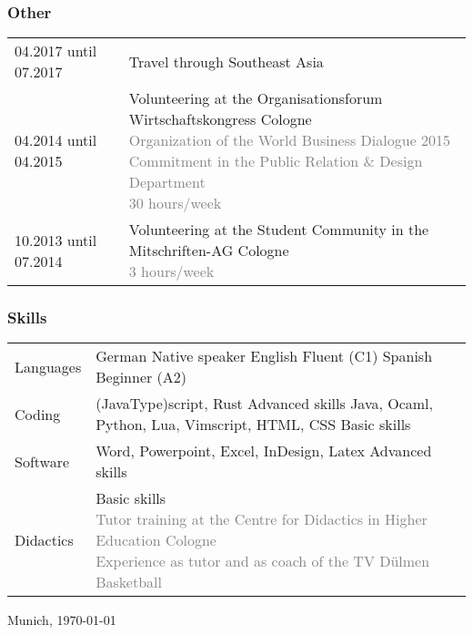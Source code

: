 \documentclass[USenglish]{article} %
\newcommand{\city}{Munich}
\begin{document}
\pagebreak
\subsubsection*{Other}
\begin{table}[h]
  \begin{tabularx}{\textwidth}{@{}p{4cm}X}

    04.2017 until 07.2017 &
    Travel through Southeast Asia \\

    04.2014 until 04.2015 &
    Volunteering at the Organisationsforum Wirtschaftskongress \textbar{} Cologne
    \textcolor{gray}{
      \newline Organization of the World Business Dialogue 2015
      \newline Commitment in the Public Relation \& Design Department
      \newline 30 hours/week} \\

    10.2013 until 07.2014 &
    Volunteering at the Student Community in the Mitschriften-AG \textbar{} Cologne
    \textcolor{gray}{
      \newline 3 hours/week} \\

  \end{tabularx}\label{tab:other}
\end{table}

\subsubsection*{Skills}
\begin{table}[h!]
  \begin{tabularx}{\textwidth}{@{}p{4cm}X}

    Languages &
    German \textbar{} Native speaker
    \newline English \textbar{} Fluent (C1)
    \newline Spanish \textbar{} Beginner (A2) \\

    Coding &
    (Java\textbar{}Type)script, Rust \textbar{} Advanced skills \newline
    Java, Ocaml, Python, Lua, Vimscript, HTML, CSS \textbar{} Basic skills \\

    Software &
    Word, Powerpoint, Excel, InDesign, Latex \textbar{} Advanced skills \\

    Didactics &
    Basic skills
    \textcolor{gray}{
      \newline Tutor training at the Centre for Didactics in Higher Education Cologne
      \newline Experience as tutor and as coach of the TV Dülmen Basketball} \\

  \end{tabularx}\label{tab:skills}
\end{table}

\bigskip
\makebox[2.5in]{\hrulefill}\newline{}
\small\city{}, \today{} \\
\end{document}
